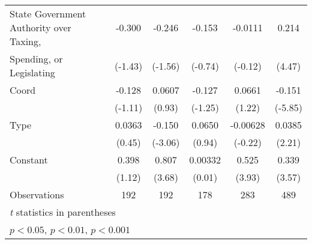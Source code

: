 {\begin{tabular}{l*{5}{c}}
\addlinespace
State Government Authority over Taxing, &-0.300         &-0.246         &-0.153         &-0.0111         &0.214\sym{***}\\
Spending, or Legislating                &(-1.43)         &(-1.56)         &(-0.74)         &(-0.12)         &(4.47)         \\
\addlinespace
Coord                                   &-0.128         &0.0607         &-0.127         &0.0661         &-0.151\sym{***}\\
                                        &(-1.11)         &(0.93)         &(-1.25)         &(1.22)         &(-5.85)         \\
\addlinespace
Type                                    &0.0363         &-0.150\sym{**} &0.0650         &-0.00628         &0.0385\sym{*}  \\
                                        &(0.45)         &(-3.06)         &(0.94)         &(-0.22)         &(2.21)         \\
\addlinespace
Constant                                &0.398         &0.807\sym{***}&0.00332         &0.525\sym{***}&0.339\sym{***}\\
                                        &(1.12)         &(3.68)         &(0.01)         &(3.93)         &(3.57)         \\
\midrule
Observations                            &  192         &  192         &  178         &  283         &  489         \\
\bottomrule
\multicolumn{6}{l}{\footnotesize \textit{t} statistics in parentheses}\\
\multicolumn{6}{l}{\footnotesize \sym{*} \(p<0.05\), \sym{**} \(p<0.01\), \sym{***} \(p<0.001\)}\\
\end{tabular}
}
